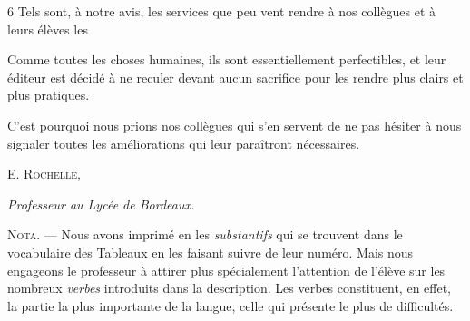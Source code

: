 \begin{VUpage}[8]{6}
\VUblancAlinea
Tels sont, à notre avis, les services que peu\cc
vent rendre à nos collègues et à leurs élèves\nl
les 

\VUblancAlinea
Comme toutes les choses humaines, ils sont\nl
essentiellement perfectibles, et leur éditeur est\nl
décidé à ne reculer devant aucun sacrifice pour\nl
les rendre plus clairs et plus pratiques.

\VUblancAlinea
C'est pourquoi nous prions nos collègues qui\nl
s'en servent de ne pas hésiter à nous signaler\nl
toutes les améliorations qui leur paraîtront\nl
nécessaires.
\VUsaut{6.0mm}
{\raggedleft\fontsize{11.0pt}{13.0pt}\selectfont\textsc{E. Rochelle,}\par}
{\raggedleft\itshape\fontsize{9.5pt}{11.5pt}\selectfont Professeur au Lycée de Bordeaux.\par}

\VUsaut{18.0mm}
{\fontsize{9.0pt}{11.0pt}\selectfont
\noindent\textsc{Nota.} --- Nous avons imprimé en  les\nl
\textit{substantifs} qui se trouvent dans le vocabulaire des\nl
Tableaux en les faisant suivre de leur numéro. Mais nous\nl
engageons le professeur à attirer plus spécialement\nl
l'attention de l'élève sur les nombreux \textit{verbes} introduits\nl
dans la description. Les verbes constituent, en effet, la\nl
partie la plus importante de la langue, celle qui présente\nl
le plus de difficultés.\par}
\end{VUpage}
